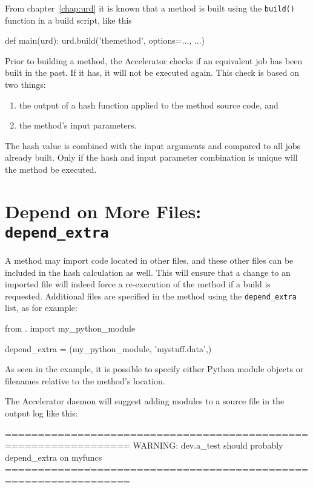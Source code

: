 From chapter~\ref{chap:urd} it is known that a method is built using
the \texttt{build()} function in a build script, like this
\begin{python}
def main(urd):
    urd.build('themethod', options=..., ...)
\end{python}

Prior to building a method, the Accelerator checks if an equivalent
job has been built in the past.  If it has, it will not be executed
again.  This check is based on two things:
\begin{enumerate}
\item  the output of a hash function applied to the method source code, and
\item  the method's input parameters.
\end{enumerate}
The hash value is combined with the input arguments and compared to
all jobs already built.  Only if the hash and input parameter
combination is unique will the method be executed.



\section{Depend on More Files:  \texttt{depend\_extra}}

A method may import code located in other files, and these other files
can be included in the hash calculation as well.  This will ensure
that a change to an imported file will indeed force a re-execution of
the method if a build is requested.  Additional files are specified in
the method using the \texttt{depend\_extra} list, as for example:
\begin{python}
from . import my_python_module

depend_extra = (my_python_module, 'mystuff.data',)
\end{python}
As seen in the example, it is possible to specify either Python module
objects or filenames relative to the method's location.

The Accelerator daemon will suggest adding modules to a source file in
the output log like this:

\begin{shell}
=================================================================
WARNING: dev.a_test should probably depend_extra on myfuncs
=================================================================
\end{shell}



